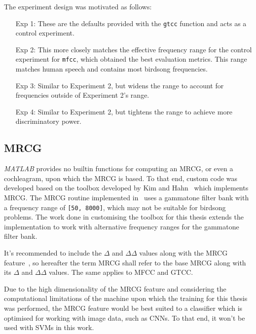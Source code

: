 The experiment design was motivated as follows:

\begin{itemize}

  \item [Exp 1:] These are the defaults provided with the \texttt{gtcc} function
    and acts as a control experiment.

  \item [Exp 2:] This more closely matches the effective frequency range for the
    control experiment for \texttt{mfcc}, which obtained the best evaluation
    metrics. This range matches human speech and contains most birdsong
    frequencies.

  \item [Exp 3:] Similar to Experiment 2, but widens the range to account for
    frequencies outside of Experiment 2's range.

  \item [Exp 4:] Similar to Experiment 2, but tightens the range to achieve more
    discriminatory power.

\end{itemize}


\subsection{MRCG}

\textit{MATLAB} provides no builtin functions for computing an MRCG, or even a
cochleagram, upon which the MRCG is based. To that end, custom code was
developed based on the toolbox developed by Kim and Hahn~\cite{kim2018voice}
which implements MRCG\@. The MRCG routine implemented in~\cite{kim2018voice}
uses a gammatone filter bank with a frequency range of \texttt{[50, 8000]},
which may not be suitable for birdsong problems. The work done in customising
the toolbox for this thesis extends the implementation to work with alternative
frequency ranges for the gammatone filter bank.

It's recommended to include the $\Delta$ and $\Delta\Delta$ values along with
the MRCG feature~\cite{chen2014feature}, so hereafter the term MRCG shall refer to
the base MRCG along with its $\Delta$ and $\Delta\Delta$ values. The same
applies to MFCC and GTCC\@.

Due to the high dimensionality of the MRCG feature and considering the
computational limitations of the machine upon which the training for this thesis
was performed, the MRCG feature would be best suited to a classifier which is
optimised for working with image data, such as CNNs\@. To that end, it won't
be used with SVMs in this work.

